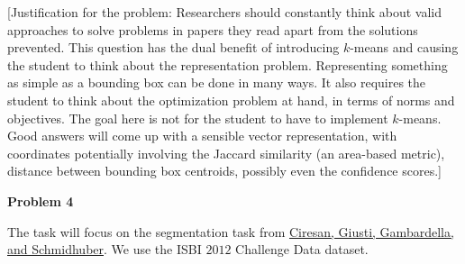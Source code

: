 \documentclass[12pt]{article}
\newcommand{\probnum}[1]
{\large {\bf Problem {#1}}}
\begin{document}
[Justification for the problem: Researchers should constantly think about valid approaches to solve problems in papers they read apart from the solutions prevented. This question has the dual benefit of introducing $k$-means and causing the student to think about the representation problem. Representing something as simple as a bounding box can be done in many ways. It also requires the student to think about the optimization problem at hand, in terms of norms and objectives. The goal here is not for the student to have to implement $k$-means. Good answers will come up with a sensible vector representation, with coordinates potentially involving the Jaccard similarity (an area-based metric), distance between bounding box centroids, possibly even the confidence scores.]

\bigskip


\FloatBarrier
\probnum{4}

The task will focus on the segmentation task from \href{http://people.idsia.ch/~juergen/nips2012.pdf}{Ciresan, Giusti, Gambardella, and Schmidhuber}. We use the ISBI $2012$ Challenge Data dataset.
\end{document}
